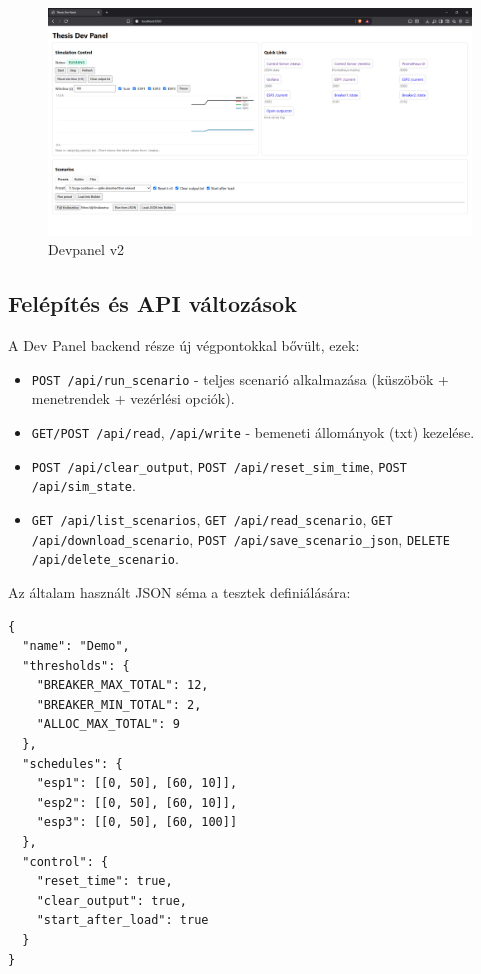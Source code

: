 \begin{figure}[H]
    \centering
    \includegraphics[width=1\textwidth]{figures/devpanel_v2.png}
    \caption{Devpanel v2}
    \label{fig:devpanel v2}
\end{figure}

\subsection{Felépítés és API változások}
A Dev Panel backend része új végpontokkal bővült, ezek:
\begin{itemize}
  \item \verb|POST /api/run_scenario| \;-\; teljes scenarió alkalmazása 
  (küszöbök + menetrendek + vezérlési opciók).
  \item \verb|GET/POST /api/read|, \verb|/api/write| \;-\; bemeneti állományok (txt) kezelése.
  \item \verb|POST /api/clear_output|, \verb|POST /api/reset_sim_time|, 
  \verb|POST /api/sim_state|.
  \item \verb|GET /api/list_scenarios|, \verb|GET /api/read_scenario|, 
  \verb|GET /api/download_scenario|, \verb|POST /api/save_scenario_json|, 
  \verb|DELETE /api/delete_scenario|.
\end{itemize}

\noindent Az általam használt JSON séma a tesztek definiálására:
\begin{verbatim}
{
  "name": "Demo",
  "thresholds": {
    "BREAKER_MAX_TOTAL": 12,
    "BREAKER_MIN_TOTAL": 2,
    "ALLOC_MAX_TOTAL": 9
  },
  "schedules": {
    "esp1": [[0, 50], [60, 10]],
    "esp2": [[0, 50], [60, 10]],
    "esp3": [[0, 50], [60, 100]]
  },
  "control": {
    "reset_time": true,
    "clear_output": true,
    "start_after_load": true
  }
}
\end{verbatim}

